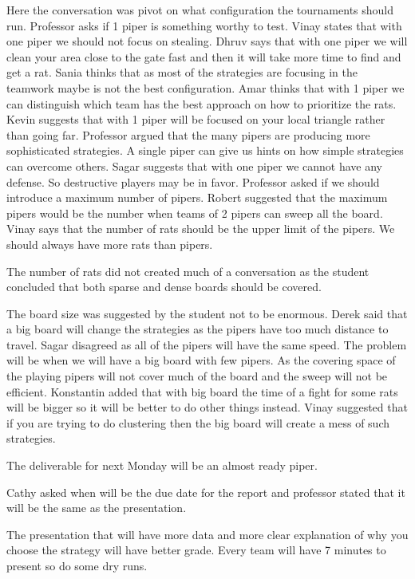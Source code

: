 Here the conversation was pivot on what configuration the tournaments should run.
Professor asks if 1 piper is something worthy to test.
Vinay states that with one piper we should not focus on stealing.
Dhruv says that with one piper we will clean your area close to the gate fast and 
then it will take more time to find and get a rat.
Sania thinks that as most of the strategies are focusing in the teamwork maybe is not the best configuration. 
Amar thinks that with 1 piper we can distinguish which team has the best approach on how to prioritize the rats.
Kevin suggests that with 1 piper will be focused on your local triangle rather than going far.
Professor argued that the many pipers are producing more sophisticated strategies. 
A single piper can give us hints on how simple strategies can overcome others.
Sagar suggests that with one piper we cannot have any defense. So destructive 
players may be in favor.
Professor asked if we should introduce a maximum number of pipers.
Robert suggested that the maximum pipers would be the number when teams of 2 pipers 
can sweep all the board.
Vinay says that the number of rats should be the upper limit of the pipers. We 
should always have more rats than pipers.

The number of rats did not created much of a conversation as the student concluded 
that both sparse and dense boards should be covered.

The board size was suggested by the student not to be enormous.
Derek said that a big board will change the strategies as the pipers have too 
much distance to travel.
Sagar disagreed as all of the pipers will have the same speed. The problem will 
be when we will have a big board with few pipers. As the covering space of the 
playing pipers will not cover much of the board and the sweep will not be efficient.
Konstantin added that with big board the time of a fight for some rats will be 
bigger so it will be better to do other things instead.
Vinay suggested that if you are trying to do clustering then the big board will 
create a mess of such strategies.

The deliverable for next Monday will be an almost ready piper.

Cathy asked when will be the due date for the report and professor stated that 
it will be the same as the presentation. 

The presentation that will have more data and more clear explanation of why you 
choose the strategy will have better grade.
Every team will have 7 minutes to present so do some dry runs.


